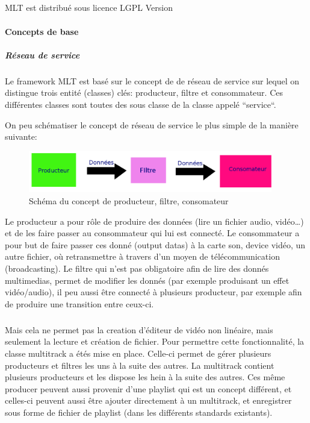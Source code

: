 \subparagraph{}

MLT est distribué sous licence LGPL Version

\paragraph{Concepts de base}

\subparagraph{Réseau de service}

\subparagraph{}

Le framework MLT est basé sur le concept de de réseau de service sur
lequel on distingue trois entité (classes) clés: producteur, filtre
et consommateur. Ces différentes classes sont toutes des sous classe
de la classe appelé ``service``.

On peu schématiser le concept de réseau de service le plus simple de
la manière suivante:

\begin{figure} [H]

  \begin{center}

    \includegraphics[width=0.95\textwidth]{images/producerConsumer}

  \end{center}

  \caption{Schéma du concept de producteur, filtre, consomateur}

  \label{Yes}

\end{figure}

Le producteur a pour rôle de produire des données (lire un fichier
audio, vidéo\ldots) et de les faire passer au consommateur qui lui est
connecté. Le consommateur a pour but de faire passer ces donné (output
datas) à la carte son, device vidéo, un autre fichier, où retransmettre
à travers d'un moyen de télécommunication (broadcasting).  Le filtre
qui n'est pas obligatoire afin de lire des donnés multimedias, permet
de modifier les donnés (par exemple produisant un effet vidéo/audio),
il peu aussi être connecté à plusieurs producteur, par exemple afin
de produire une transition entre ceux-ci.

\subparagraph{}

Mais cela ne permet pas la creation d'éditeur de vidéo non linéaire,
mais seulement la lecture et création de fichier. Pour permettre cette
fonctionnalité, la classe multitrack a étés mise en place. Celle-ci
permet de gérer plusieurs producteurs et filtres les uns à la suite des
autres. La multitrack contient plusieurs producteurs et les dispose les
hein à la suite des autres. Ces même producer peuvent aussi provenir
d'une playlist qui est un concept différent, et celles-ci peuvent aussi
être ajouter directement à un multitrack, et enregistrer sous forme
de fichier de playlist (dans les différents standards existants).

